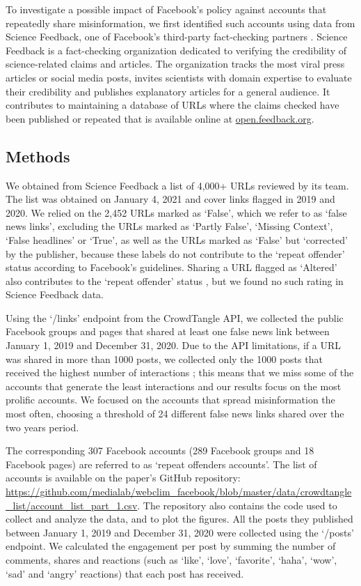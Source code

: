 \documentclass[review]{elsarticle}
\begin{document}
To investigate a possible impact of Facebook’s policy against accounts that repeatedly share misinformation, we first identified such accounts using data from Science Feedback, one of Facebook’s third-party fact-checking partners \cite{sciencefeedbackFbPartner}.
Science Feedback is a fact-checking organization dedicated to verifying the credibility of science-related claims and articles. 
The organization tracks the most viral press articles or social media posts, invites scientists with domain expertise to evaluate their credibility and publishes explanatory articles for a general audience. 
It contributes to maintaining a database of URLs where the claims checked have been published or repeated that is available online at \url{open.feedback.org}.

\subsection{Methods}

We obtained from Science Feedback a list of 4,000+ URLs reviewed by its team. 
The list was obtained on January 4, 2021 and cover links flagged in 2019 and 2020.
We relied on the 2,452 URLs marked as `False', which we refer to as `false news links', excluding the URLs marked as `Partly False', `Missing Context', `False headlines' or `True', as well as the URLs marked as `False' but `corrected' by the publisher, because these labels do not contribute to the `repeat offender' status according to Facebook's guidelines.
Sharing a URL flagged as `Altered' also contributes to the `repeat offender' status \citep{factCheckingRules, repeatOffenderCommunication}, but we found no such rating in Science Feedback data.

Using the `/links' endpoint from the CrowdTangle API, we collected the public Facebook groups and pages that shared at least one false news link between January 1, 2019 and December 31, 2020. 
Due to the API limitations, if a URL was shared in more than 1000 posts, we collected only the 1000 posts that received the highest number of interactions \cite{docCT}; this means that we miss some of the accounts that generate the least interactions and our results focus on the most prolific accounts.
We focused on the accounts that spread misinformation the most often, choosing a threshold of 24 different false news links shared over the two years period. 

The corresponding 307 Facebook accounts (289 Facebook groups and 18 Facebook pages) are referred to as `repeat offenders accounts'. 
The list of accounts is available on the paper’s GitHub repository: {\color{red} \url{https://github.com/medialab/webclim_facebook/blob/master/data/crowdtangle_list/account_list_part_1.csv}}.
The repository also contains the code used to collect and analyze the data, and to plot the figures.
All the posts they published between January 1, 2019 and December 31, 2020 were collected using the `/posts' endpoint. 
We calculated the engagement per post by summing the number of comments, shares and reactions (such as ‘like’, ‘love’, ‘favorite’, ‘haha’, ‘wow’, ‘sad’ and ‘angry’ reactions) that each post has received.
\end{document}
